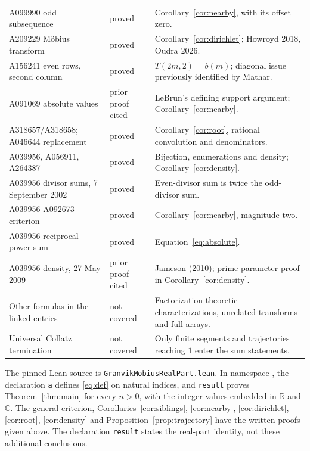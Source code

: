 \documentclass[11pt]{article}
\begin{document}
\begin{longtable}{@{}>{\raggedright\arraybackslash}p{.31\linewidth}>{\raggedright\arraybackslash}p{.20\linewidth}>{\raggedright\arraybackslash}p{.44\linewidth}@{}}
A099990 odd subsequence&proved&Corollary~\ref{cor:nearby}, with its offset zero.\\
A209229 M\"obius transform&proved&Corollary~\ref{cor:dirichlet}; Howroyd 2018, Oudra 2026.\\
A156241 even rows, second column&proved&$T(2m,2)=b(m)$; diagonal issue previously identified by Mathar.\\
A091069 absolute values&prior proof cited&LeBrun's defining support argument; Corollary~\ref{cor:nearby}.\\
A318657/A318658; A046644 replacement&proved&Corollary~\ref{cor:root}, rational convolution and denominators.\\
A039956, A056911, A264387&proved&Bijection, enumerations and density; Corollary~\ref{cor:density}.\\
A039956 divisor sums, 7 September 2002&proved&Even-divisor sum is twice the odd-divisor sum.\\
A039956 A092673 criterion&proved&Corollary~\ref{cor:nearby}, magnitude two.\\
A039956 reciprocal-power sum&proved&Equation~\eqref{eq:absolute}.\\
A039956 density, 27 May 2009&prior proof cited&Jameson (2010); prime-parameter proof in Corollary~\ref{cor:density}.\\
Other formulas in the linked entries&not covered&Factorization-theoretic characterizations, unrelated transforms and full arrays.\\
Universal Collatz termination&not covered&Only finite segments and trajectories reaching $1$ enter the sum statements.\\
\bottomrule
\end{longtable}\endgroup

The pinned Lean source is
\href{https://github.com/the-omega-institute/trureturing/blob/3bedf2870aacc6e7f17353444aadaa49fb73157c/D5/S3/Arith/Mobius/GranvikMobiusRealPart.lean}{\texttt{GranvikMobiusRealPart.lean}}.
In namespace ,
the declaration \texttt{a} defines \eqref{eq:def} on natural indices,
and \texttt{result} proves Theorem~\ref{thm:main} for every $n>0$,
with the integer values embedded in $\mathbb R$ and $\mathbb C$.
The general criterion, Corollaries~\ref{cor:siblings}, \ref{cor:nearby},
\ref{cor:dirichlet}, \ref{cor:root}, \ref{cor:density} and
Proposition~\ref{prop:trajectory} have the written proofs given above.
The declaration \texttt{result} states the real-part identity, not these
additional conclusions.
\end{document}
